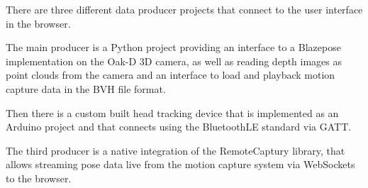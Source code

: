 There are three different data producer projects that connect to the user interface in the browser.

The main producer is a Python project providing an interface to a Blazepose implementation on the Oak-D \ac{3D} camera, as well as reading depth images as point clouds from the camera and an interface to load and playback motion capture data in the \ac{BVH} file format.

Then there is a custom built head tracking device that is implemented as an Arduino project and that connects using the BluetoothLE standard via \ac{GATT}.

The third producer is a native integration of the RemoteCaptury library, that allows streaming pose data live from the motion capture system via WebSockets to the browser.

